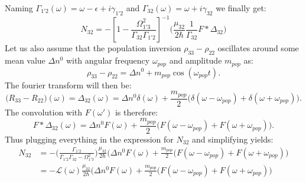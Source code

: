 \documentclass[10pt,english,fleqn]{article}%
\begin{document}
Naming $\Gamma_{1'2}(\omega) = \omega - \epsilon +i\gamma_{1'2}$ and $\Gamma_{32}(\omega) = \omega + i \gamma_{32} $ we finally get:
$$
N_{32} = - \left [ 1-\frac{\Omega_{1'3}^2}{\Gamma_{32}\Gamma_{1'2}} \right ]^{-1}  \Big(  \frac{\mu_{32}}{2\hbar}\frac{1}{\Gamma_{32}}F*\Delta_{32} \Big ) 
$$
Let us also assume that the population inversion $\rho_{33} - \rho_{22} $ oscillates around some mean value $\Delta n^0$ with angular frequency $\omega_{pop}$ and amplitude $m_{pop}$ as:
$$
\rho_{33}-\rho_{22} = \Delta n^0 +m_{pop} \cos(\omega_{pop}t).
$$
The fourier transform will then be:
$$
\Big (R_{33}-R_{22} \Big )(\omega) = \Delta_{32}(\omega) = \Delta n^0\delta(\omega) +\frac{m_{pop}}{2} \Big ( \delta(\omega-\omega_{pop} )+ \delta(\omega+\omega_{pop}) \Big ). 
$$
The convolution with $F(\omega')$ is therefore:
$$
F* \Delta_{32}(\omega) = \Delta n^0 F(\omega) +\frac{m_{pop}}{2} \Big ( F(\omega-\omega_{pop} )+ F(\omega+\omega_{pop}) \Big ). 
$$ 
Thus plugging everything in the expression for $N_{32}$ and simplifying yields:
\begin{align}
N_{32} &=  -\Big ( \frac{\Gamma_{1'2}}{\Gamma_{1'2}\Gamma_{32} - \Omega_{1'3}^2}\Big )    \frac{\mu_{32}}{2\hbar} \Big (\Delta n^0 F(\omega) +\frac{m_{pop}}{2}  ( F(\omega-\omega_{pop} )+ F(\omega+\omega_{pop}) \Big) \nonumber \\
&= -\mathcal{L} (\omega) \frac{\mu_{32}}{2\hbar}\Big (\Delta n^0 F(\omega) +\frac{m_{pop}}{2}  ( F(\omega-\omega_{pop} )+ F(\omega+\omega_{pop}) \Big)
\end{align}
\end{document}
